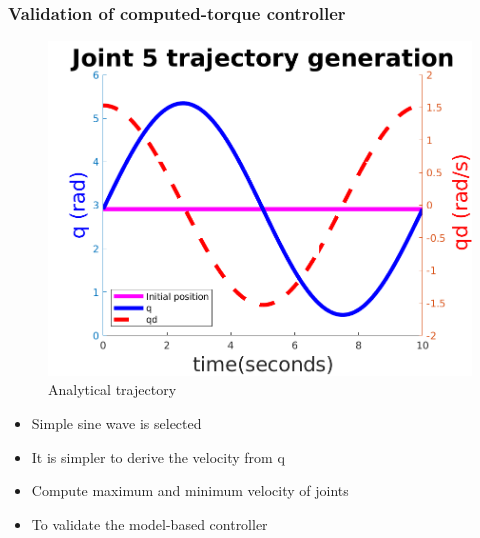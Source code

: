 \documentclass{beamer}
\begin{document}
\begin{frame}
	\frametitle{Validation of computed-torque controller}
	\centering
\begin{minipage}{.45\textwidth}
\begin{figure}[H]
	\centering
	\includegraphics[trim=0 0 0 0,width=0.45\paperwidth, height=0.45\paperheight]{images/sinewave}
	\caption{Analytical trajectory}
\end{figure}		
\end{minipage}
\hfill
\begin{minipage}{.45\textwidth}
\begin{itemize}
	\item Simple sine wave is selected
	\item It is simpler to derive the velocity from q
	\item Compute maximum and minimum velocity of joints
	\item To validate the model-based controller
\end{itemize}
\end{minipage}
\end{frame}
\end{document}
